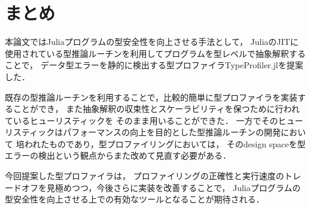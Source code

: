 
\section{まとめ} \label{section:conclusion}

本論文ではJuliaプログラムの型安全性を向上させる手法として，
JuliaのJITに使用されている型推論ルーチンを利用してプログラムを型レベルで抽象解釈することで，
データ型エラーを静的に検出する型プロファイラTypeProfiler.jlを提案した．

既存の型推論ルーチンを利用することで，比較的簡単に型プロファイラを実装することができ，
また抽象解釈の収束性とスケーラビリティを保つために行われているヒューリスティックを
そのまま用いることができた．
一方でそのヒューリスティックはパフォーマンスの向上を目的とした型推論ルーチンの開発において
培われたものであり，型プロファイリングにおいては，
そのdesign spaceを型エラーの検出という観点からまた改めて見直す必要がある．

今回提案した型プロファイラは，
プロファイリングの正確性と実行速度のトレードオフを見極めつつ，今後さらに実装を改善することで，
Juliaプログラムの型安全性を向上させる上での有効なツールとなることが期待される．
